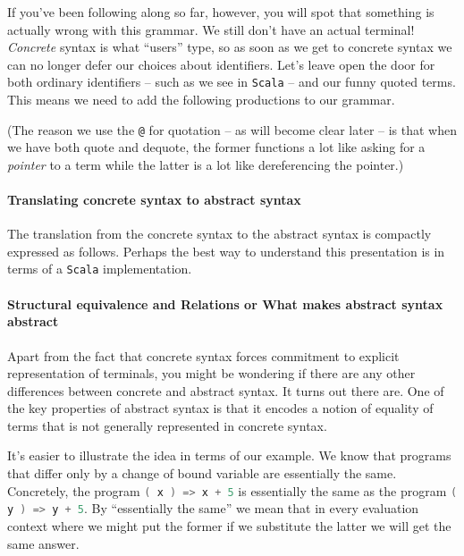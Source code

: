 If you've been following along so far, however, you will spot that
something is actually wrong with this grammar. We still don't have an
actual terminal! \emph{Concrete} syntax is what ``users'' type, so as
soon as we get to concrete syntax we can no longer defer our choices
about identifiers. Let's leave open the door for both ordinary
identifiers -- such as we see in \texttt{Scala} -- and our funny
quoted terms. This means we need to add the following productions to
our grammar.


(The reason we use the \texttt{@} for quotation -- as will become
clear later -- is that when we have both quote and dequote, the former
functions a lot like asking for a \emph{pointer} to a term while the
latter is a lot like dereferencing the pointer.)

\paragraph{Translating concrete syntax to abstract syntax}
The translation from the concrete syntax to the abstract syntax is
compactly expressed as follows. Perhaps the best way to understand
this presentation is in terms of a \texttt{Scala} implementation.



\paragraph{Structural equivalence and Relations or What makes abstract syntax abstract}

Apart from the fact that concrete syntax forces commitment to explicit
representation of terminals, you might be wondering if there are any
other differences between concrete and abstract syntax. It turns out
there are. One of the key properties of abstract syntax is that it
encodes a notion of equality of terms that is not generally
represented in concrete syntax.

It's easier to illustrate the idea in terms of our example. We know
that programs that differ only by a change of bound variable are
essentially the same. Concretely, the program
\lstinline[language=Scala]!( x ) => x + 5! is essentially the same as
the program \lstinline[language=Scala]!( y ) => y + 5!. By
``essentially the same'' we mean that in every evaluation context
where we might put the former if we substitute the latter we will get
the same answer. 

